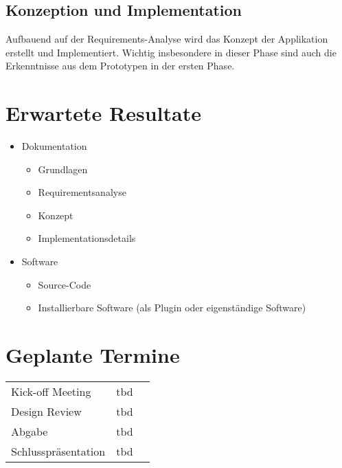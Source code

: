 \subsection{Konzeption und Implementation}
Aufbauend auf der Requirements-Analyse wird das Konzept der Applikation erstellt und Implementiert. Wichtig insbesondere in dieser Phase sind auch die Erkenntnisse aus dem Prototypen in der ersten Phase. 

\section{Erwartete Resultate}
\begin{itemize}
	\item Dokumentation
		\begin{itemize}
			\item Grundlagen
			\item Requirementsanalyse
			\item Konzept
			\item Implementationsdetails
		\end{itemize}
	\item Software
		\begin{itemize}
			\item Source-Code
			\item Installierbare Software (als Plugin oder eigenst\"andige Software)
		\end{itemize}
\end{itemize}
\section{Geplante Termine}
\begin{tabular}{ l c r }
   Kick-off Meeting & tbd \\
   Design Review & tbd \\
   Abgabe & tbd \\
   Schlusspr\"asentation & tbd \\
\end{tabular}